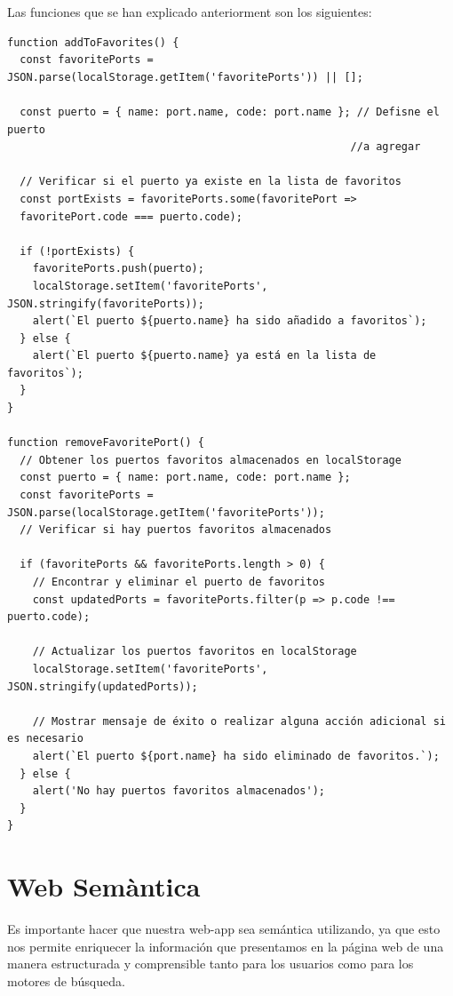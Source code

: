 \documentclass{article}
\begin{document}
\noindent Las funciones que se han explicado anteriorment son los siguientes:
\begin{verbatim}
function addToFavorites() {
  const favoritePorts = JSON.parse(localStorage.getItem('favoritePorts')) || [];

  const puerto = { name: port.name, code: port.name }; // Defisne el puerto 
                                                      //a agregar

  // Verificar si el puerto ya existe en la lista de favoritos
  const portExists = favoritePorts.some(favoritePort => 
  favoritePort.code === puerto.code);

  if (!portExists) {
    favoritePorts.push(puerto);
    localStorage.setItem('favoritePorts', JSON.stringify(favoritePorts));
    alert(`El puerto ${puerto.name} ha sido añadido a favoritos`);
  } else {
    alert(`El puerto ${puerto.name} ya está en la lista de favoritos`);
  }
}

function removeFavoritePort() {
  // Obtener los puertos favoritos almacenados en localStorage
  const puerto = { name: port.name, code: port.name };
  const favoritePorts = JSON.parse(localStorage.getItem('favoritePorts'));
  // Verificar si hay puertos favoritos almacenados
  
  if (favoritePorts && favoritePorts.length > 0) {
    // Encontrar y eliminar el puerto de favoritos
    const updatedPorts = favoritePorts.filter(p => p.code !== puerto.code);

    // Actualizar los puertos favoritos en localStorage
    localStorage.setItem('favoritePorts', JSON.stringify(updatedPorts));

    // Mostrar mensaje de éxito o realizar alguna acción adicional si es necesario
    alert(`El puerto ${port.name} ha sido eliminado de favoritos.`);
  } else {
    alert('No hay puertos favoritos almacenados');
  }
}
\end{verbatim}

\section{Web Semàntica}
Es importante hacer que nuestra web-app sea semántica utilizando, ya que esto nos permite enriquecer la información que presentamos en la página web de una manera estructurada y comprensible tanto para los usuarios como para los motores de búsqueda.\\
\end{document}
